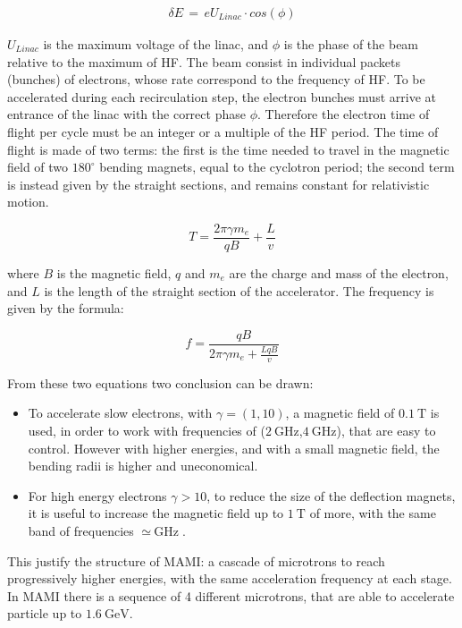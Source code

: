 \begin{align*}
\delta E \, = \, e U_{Linac} \cdot cos(\phi)
\end{align*} 

$U_{Linac}$ is the maximum voltage of the linac, and $\phi$ is the phase of the beam relative to the maximum of HF. The beam consist in individual packets (bunches) of electrons, whose rate correspond to the frequency of HF. To be accelerated during each recirculation step, the electron bunches must arrive at entrance of the linac with the correct phase $\phi$. Therefore the electron time of flight per cycle must be an integer or a multiple of the HF period. The time of flight is made of two terms: the first is the time needed to travel in the magnetic field of two $180^{\circ}$ bending magnets, equal to the cyclotron period; the second term is instead given by the straight sections, and remains constant for relativistic motion. 

\begin{equation} \label{eq:TimeofFlight}
T = \dfrac{2 \pi \gamma m_{e} }{qB} + \dfrac{L}{v}
\end{equation}

where $B$ is the magnetic field, $q$ and $m_{e}$ are the charge and mass of the electron, and $L$ is the length of the straight section of the accelerator. The frequency is given by the formula:

\begin{equation} \label{eq:frequency}
f = \dfrac{qB}{2 \pi \gamma m_{e} + \frac{LqB}{v}} 
\end{equation}

From these two equations two conclusion can be drawn:

\begin{itemize}
\item To accelerate slow electrons, with $\gamma = (1,10)$, a magnetic field of $\SI{0.1}{\tesla}$ is used, in order to work with frequencies of ($\SI{2}{\giga \hertz}$,$\SI{4}{\giga \hertz}$), that are easy to control. However with higher energies, and with a small magnetic field, the bending radii is higher and uneconomical.
\item For high energy electrons $\gamma > 10$, to reduce the size of the deflection magnets, it is useful to increase the magnetic field up to $\SI{1}{\tesla}$ of more, with the same band of frequencies $\simeq \SI{}{\giga \hertz}$.
\end{itemize}

This justify the structure of MAMI: a cascade of microtrons to reach progressively higher energies, with the same acceleration frequency at each stage. In MAMI there is a sequence of 4 different microtrons, that are able to accelerate particle up to $\SI{1.6}{\giga \electronvolt}$. 

